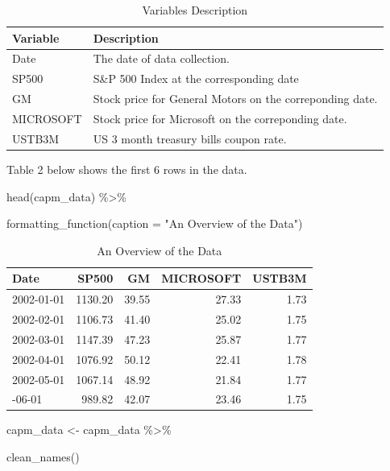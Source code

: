 \documentclass[
]{article}
\newenvironment{Shaded}{\begin{snugshade}}{\end{snugshade}}
\newcommand{\AttributeTok}[1]{\textcolor[rgb]{0.77,0.63,0.00}{#1}}
\newcommand{\FunctionTok}[1]{\textcolor[rgb]{0.00,0.00,0.00}{#1}}
\newcommand{\NormalTok}[1]{#1}
\newcommand{\OtherTok}[1]{\textcolor[rgb]{0.56,0.35,0.01}{#1}}
\newcommand{\SpecialCharTok}[1]{\textcolor[rgb]{0.00,0.00,0.00}{#1}}
\newcommand{\StringTok}[1]{\textcolor[rgb]{0.31,0.60,0.02}{#1}}
\begin{document}
\begin{table}[!h]

\caption{\label{tab:unnamed-chunk-2}Variables Description}
\centering
\begin{tabular}[t]{ll}
\toprule
Variable & Description\\
\midrule
Date & The date of data collection.\\
SP500 & S\&P 500 Index at the corresponding date\\
GM & Stock price for General Motors on the correponding date.\\
MICROSOFT & Stock price for Microsoft on the correponding date.\\
USTB3M & US 3 month treasury bills coupon rate.\\
\bottomrule
\end{tabular}
\end{table}

Table 2 below shows the first 6 rows in the data.

\begin{Shaded}
\begin{Highlighting}[]
\FunctionTok{head}\NormalTok{(capm\_data) }\SpecialCharTok{\%\textgreater{}\%} 
    
    \FunctionTok{formatting\_function}\NormalTok{(}\AttributeTok{caption =} \StringTok{"An Overview of the Data"}\NormalTok{)}
\end{Highlighting}
\end{Shaded}

\begin{table}[!h]

\caption{\label{tab:unnamed-chunk-3}An Overview of the Data}
\centering
\begin{tabular}[t]{lrrrr}
\toprule
Date & SP500 & GM & MICROSOFT & USTB3M\\
\midrule
2002-01-01 & 1130.20 & 39.55 & 27.33 & 1.73\\
2002-02-01 & 1106.73 & 41.40 & 25.02 & 1.75\\
2002-03-01 & 1147.39 & 47.23 & 25.87 & 1.77\\
2002-04-01 & 1076.92 & 50.12 & 22.41 & 1.78\\
2002-05-01 & 1067.14 & 48.92 & 21.84 & 1.77\\
\addlinespace
2002-06-01 & 989.82 & 42.07 & 23.46 & 1.75\\
\bottomrule
\end{tabular}
\end{table}

\begin{Shaded}
\begin{Highlighting}[]
\NormalTok{capm\_data }\OtherTok{\textless{}{-}}\NormalTok{ capm\_data }\SpecialCharTok{\%\textgreater{}\%} 
    
    \FunctionTok{clean\_names}\NormalTok{()}
\end{Highlighting}
\end{Shaded}
\end{document}

